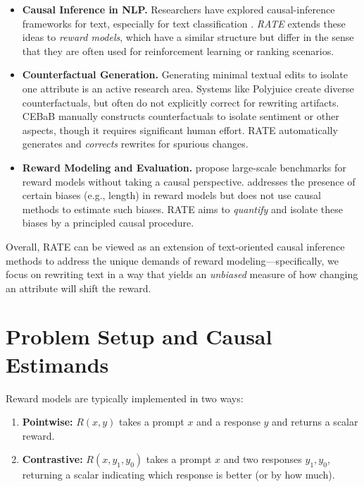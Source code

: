 \begin{itemize}
    \item \textbf{Causal Inference in NLP.} Researchers have explored causal-inference frameworks for text, especially for text classification \cite{feder2022causalinferencenaturallanguage}. \emph{RATE} extends these ideas to \emph{reward models}, which have a similar structure but differ in the sense that they are often used for reinforcement learning or ranking scenarios.
    \item \textbf{Counterfactual Generation.} Generating minimal textual edits to isolate one attribute is an active research area. Systems like Polyjuice \cite{wu2021polyjuicegeneratingcounterfactualsexplaining} create diverse counterfactuals, but often do not explicitly correct for rewriting artifacts. CEBaB \cite{abraham2022cebab} manually constructs counterfactuals to isolate sentiment or other aspects, though it requires significant human effort. RATE automatically generates and \emph{corrects} rewrites for spurious changes.
    \item \textbf{Reward Modeling and Evaluation.} \cite{lambert2024rewardbenchevaluatingrewardmodels} propose large-scale benchmarks for reward models without taking a causal perspective. \cite{park2024offsetbias} addresses the presence of certain biases (e.g., length) in reward models but does not use causal methods to estimate such biases. RATE aims to \emph{quantify} and isolate these biases by a principled causal procedure.
\end{itemize}

Overall, RATE can be viewed as an extension of text-oriented causal inference methods to address the unique demands of reward modeling—specifically, we focus on rewriting text in a way that yields an \emph{unbiased} measure of how changing an attribute will shift the reward.

\section{Problem Setup and Causal Estimands}
\label{sec:setup}

Reward models are typically implemented in two ways:

\begin{enumerate}
  \item \textbf{Pointwise:} $R(x, y)$ takes a prompt $x$ and a response $y$ and returns a scalar reward.
  \item \textbf{Contrastive:} $R(x, y_1, y_0)$ takes a prompt $x$ and two responses $y_1, y_0$, returning a scalar indicating which response is better (or by how much).
\end{enumerate}

